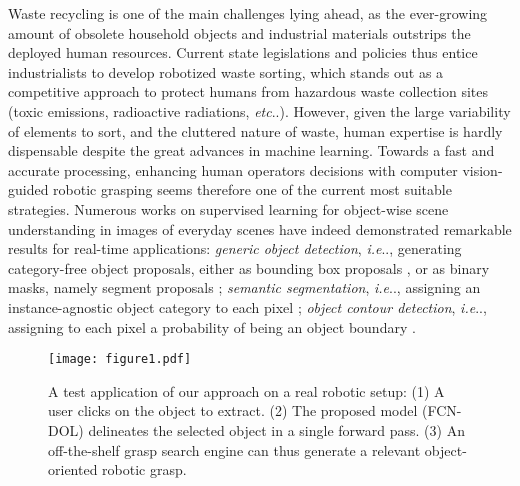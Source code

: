 \documentclass[runningheads,a4paper]{llncs}
\makeatletter
\DeclareRobustCommand\onedot{\futurelet\@let@token\@onedot}
\newcommand*\@onedot{\ifx\@let@token.\else.\null\fi\xspace}
\newcommand*\ie{\emph{i.e}\onedot} \newcommand*\Ie{\emph{I.e}\onedot}
\newcommand*\etc{\emph{etc}\onedot} \newcommand*\vs{\emph{vs}\onedot}
\makeatother
\begin{document}
Waste recycling is one of the main challenges lying ahead, as the ever-growing amount of obsolete household objects and industrial materials outstrips the deployed human resources. Current state legislations and policies thus entice industrialists to develop robotized waste sorting, which stands out as a competitive approach to protect humans from hazardous waste collection sites (toxic emissions, radioactive radiations, \etc). However, given the large variability of elements to sort, and the cluttered nature of waste, human expertise is hardly dispensable despite the great advances in machine learning. Towards a fast and accurate processing, enhancing human operators decisions with computer vision-guided robotic grasping seems therefore one of the current most suitable strategies. Numerous works on supervised learning for object-wise scene understanding in images of everyday scenes have indeed demonstrated remarkable results for real-time applications: \emph{generic object detection}, \ie, generating category-free object proposals, either as bounding box proposals \cite{FasterRCNN, HosangBDS15}, or as binary masks, namely segment proposals \cite{MaskRCNN, SharpMask, Pont-TusetABMM15, KrahenbuhlK15}; \emph{semantic segmentation}, \ie, assigning an instance-agnostic object category to each pixel \cite{Lin_2016_CVPR, LongSD15}; \emph{object contour detection}, \ie, assigning to each pixel a probability of being an object boundary \cite{Yang2016CEDN, DollarZ14}.

\begin{figure}[h!]
\centering
\texttt{[image: figure1.pdf]}
\caption{A test application of our approach on a real robotic setup: (1) A user clicks on the object to extract. (2) The proposed model (FCN-DOL) delineates the selected object in a single forward pass. (3) An off-the-shelf grasp search engine can thus generate a relevant object-oriented robotic grasp.}
\label{fig:robotResults}
\end{figure}
\end{document}
